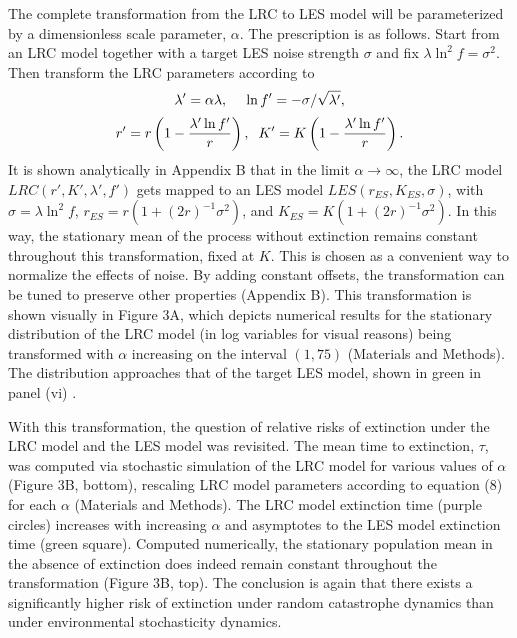 The complete transformation from the LRC to LES model will be parameterized by a dimensionless scale parameter, $\alpha$.  The prescription is as follows.  Start from an LRC model together with a target LES noise strength $\sigma$ and fix $\lambda\ln^2 f = \sigma^2$.  Then transform the LRC parameters according to
\begin{equation*}
\lambda' = \alpha \lambda,\text{\hspace{.4cm}}\ln f' = -\sigma/\sqrt{\lambda'},
\end{equation*}
\begin{equation}
r' = r\left(1- \frac{\lambda'\ln f'}{r}\right),\text{\hspace{.2cm}} K' = K\left(1  -\frac{\lambda'\ln f'}{r}\right).
\end{equation}
\noindent It is shown analytically in Appendix B that in the limit $\alpha \to \infty$, the LRC model $LRC(r',K',\lambda',f')$ gets mapped to an LES model $LES(r_{ES},K_{ES},\sigma)$, with $\sigma = \lambda\ln^2f$, $r_{ES} = r(1+(2r)^{-1}\sigma^2)$, and $K_{ES} = K(1+(2r)^{-1}\sigma^2)$.  In this way, the stationary mean of the process without extinction remains constant throughout this transformation, fixed at $K$.  This is chosen as a convenient way to normalize the effects of noise.  By adding constant offsets, the transformation can be tuned to preserve other properties (Appendix B).  This transformation is shown visually in Figure 3A, which depicts numerical results for the stationary distribution of the LRC model (in log variables for visual reasons) being transformed with $\alpha$ increasing on the interval $(1,75)$ (Materials and Methods).  The distribution approaches that of the target LES model, shown in green in panel (vi) .  

With this transformation, the question of relative risks of extinction under the LRC model and the LES model was revisited.  The mean time to extinction, $\tau$, was computed via stochastic simulation of the LRC model for various values of $\alpha$ (Figure 3B, bottom), rescaling LRC model parameters according to equation (8) for each $\alpha$ (Materials and Methods).  The LRC model extinction time (purple circles)  increases with increasing $\alpha$ and asymptotes to the LES model extinction time (green square).  Computed numerically, the stationary population mean in the absence of extinction does indeed remain constant throughout the transformation (Figure 3B, top).  The conclusion is again that there exists a significantly higher risk of extinction under random catastrophe dynamics than under environmental stochasticity dynamics.  

